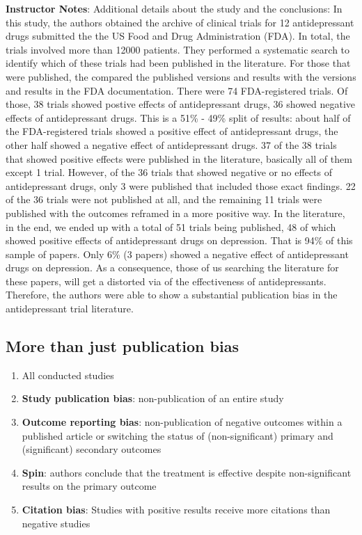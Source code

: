 \documentclass[
  letterpaper,
  DIV=11,
  numbers=noendperiod]{scrartcl}
\providecommand{\tightlist}{%
  \setlength{\itemsep}{0pt}\setlength{\parskip}{0pt}}
\begin{document}
\textbf{Instructor Notes}: Additional details about the study and the
conclusions: In this study, the authors obtained the archive of clinical
trials for 12 antidepressant drugs submitted the the US Food and Drug
Administration (FDA). In total, the trials involved more than 12000
patients. They performed a systematic search to identify which of these
trials had been published in the literature. For those that were
published, the compared the published versions and results with the
versions and results in the FDA documentation. There were 74
FDA-registered trials. Of those, 38 trials showed postive effects of
antidepressant drugs, 36 showed negative effects of antidepressant
drugs. This is a 51\% - 49\% split of results: about half of the
FDA-registered trials showed a positive effect of antidepressant drugs,
the other half showed a negative effect of antidepressant drugs. 37 of
the 38 trials that showed positive effects were published in the
literature, basically all of them except 1 trial. However, of the 36
trials that showed negative or no effects of antidepressant drugs, only
3 were published that included those exact findings. 22 of the 36 trials
were not published at all, and the remaining 11 trials were published
with the outcomes reframed in a more positive way. In the literature, in
the end, we ended up with a total of 51 trials being published, 48 of
which showed positive effects of antidepressant drugs on depression.
That is 94\% of this sample of papers. Only 6\% (3 papers) showed a
negative effect of antidepressant drugs on depression. As a consequence,
those of us searching the literature for these papers, will get a
distorted via of the effectiveness of antidepressants. Therefore, the
authors were able to show a substantial publication bias in the
antidepressant trial literature.

\subsection{More than just publication
bias}\label{more-than-just-publication-bias}

\begin{enumerate}
\def\labelenumi{(\alph{enumi})}
\tightlist
\item
  All conducted studies
\item
  \textbf{Study publication bias}: non-publication of an entire study
\item
  \textbf{Outcome reporting bias}: non-publication of negative outcomes
  within a published article or switching the status of
  (non-significant) primary and (significant) secondary outcomes
\item
  \textbf{Spin}: authors conclude that the treatment is effective
  despite non-significant results on the primary outcome
\item
  \textbf{Citation bias}: Studies with positive results receive more
  citations than negative studies
\end{enumerate}
\end{document}
